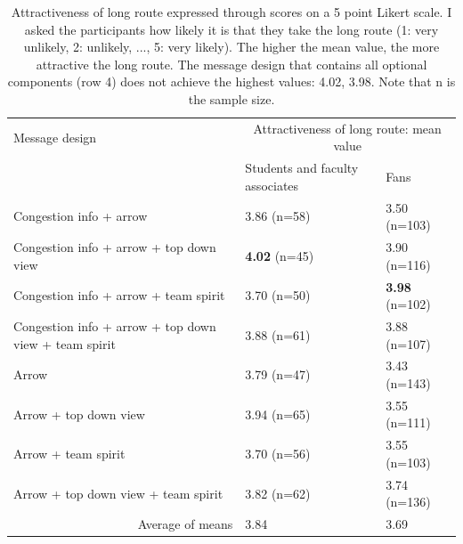 \begin{table}[ht!]
\begin{footnotesize}
\begin{tabular}{|p{8cm}|p{3cm}|p{2cm}|}
  \hline
Message design &   \multicolumn{2}{c|}{Attractiveness of long route: mean value}                                                                                                                                             \\ \cline{2-3}
 & Students and faculty associates   & Fans   \\
  \hline
  Congestion info + arrow &  3.86 (n=58) &3.50 (n=103)   \\ \hline
  Congestion info + arrow + top down view & \textbf{4.02} (n=45) & 3.90 (n=116) \\ \hline
   Congestion info + arrow + team spirit &  3.70  (n=50) & \textbf{3.98} (n=102) \\ \hline
 Congestion info + arrow + top down view + team spirit& 3.88 (n=61) &3.88 (n=107) \\ \hline
    Arrow & 3.79 (n=47) & 3.43 (n=143)  \\ \hline
   Arrow + top down view &3.94 (n=65) & 3.55 (n=111)  \\ \hline
    Arrow + team spirit  & 3.70 (n=56) & 3.55 (n=103)  \\ \hline
    Arrow + top down view + team spirit &3.82 (n=62) & 3.74 (n=136) \\ 
   \hline
 \multicolumn{1}{|r|}{ Average of means } & \multicolumn{1}{l|}{  3.84} & \multicolumn{1}{l|}{  3.69} \\
 \hline
\end{tabular}
\end{footnotesize}
\caption[Attractiveness of long route expressed through scores on a 5 point Likert scale]{
 Attractiveness of long route expressed through scores on a 5 point Likert scale.
I asked the participants how likely it is that they take the long route (1: very unlikely, 2: unlikely, ..., 5: very likely). The higher the mean value, the more attractive the long route. The message design that contains all optional components (row 4) does not achieve the highest values: 4.02, 3.98. Note that n is the sample size.}
\label{tab2}
\end{table}



